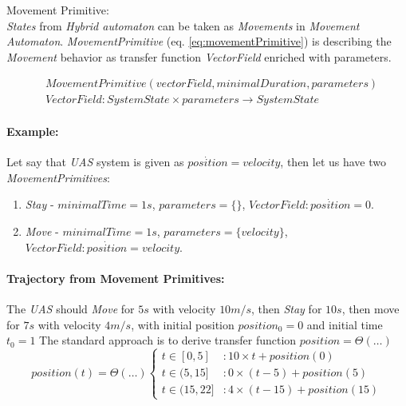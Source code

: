     \begin{definition}{Movement Primitive:}\label{def:MovementPrimitive}\\\emph{States} from \emph{Hybrid automaton} can be taken as \emph{Movements} in \emph{Movement Automaton}. \emph{MovementPrimitive} (eq. \ref{eq:movementPrimitive}) is describing the \emph{Movement} behavior as transfer function \emph{VectorField} enriched with parameters. 

    \begin{equation}\label{eq:movementPrimitive}
        \begin{aligned}
            &MovementPrimitive(vectorField,minimalDuration,parameters)\\
            &VectorField:SystemState\times parameters \to SystemState
        \end{aligned}
    \end{equation}
    \end{definition}



    \paragraph{Example: }Let say that \emph{UAS} system is given as $\dot{position}=velocity$, then let us have two \emph{MovementPrimitives}:
    
    \begin{enumerate}
        \item \textit{Stay} - $minimalTime=1s$, $parameters=\{\}$, $VectorField:\dot{position}=0$.
        \item \textit{Move} - $minimalTime=1s$, $parameters=\{velocity\}$, $VectorField:\dot{position}=velocity$.
    \end{enumerate}
    
    \paragraph{Trajectory from Movement Primitives:} The \emph{UAS} should \emph{Move} for $5s$ with velocity $10 m/s$, then \emph{Stay} for $10s$, then move for $7s$ with velocity $4 m/s$, with initial position $position_0=0$ and initial time $t_0=1$ The standard approach is to derive transfer function $position = \Theta(\dots)$
    \begin{equation}\label{eq:trajectoryExample}
        position(t)=\Theta(\dots)
        \begin{cases}
            t \in [0,5] &: 10\times t + position(0)\\
            t \in (5,15] &: 0\times (t-5) + position(5)\\
            t \in (15,22]&: 4\times (t-15) + position(15)
        \end{cases}
    \end{equation}

